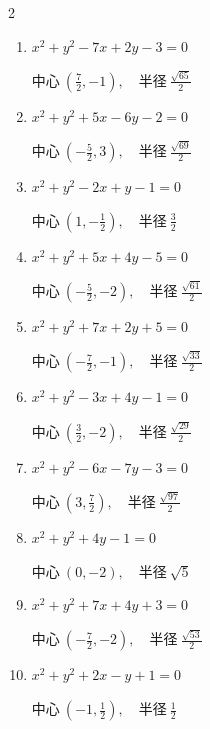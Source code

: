 \begin{multicols}{2}
\begin{enumerate}
        $\displaystyle 中心\: \left(\frac{3}{2},-2\right), \quad 半径 \ \frac{\sqrt{17}}{2}$

  \item $x^{2}+y^{2}-7x+2y-3=0$

        $\displaystyle 中心\: \left(\frac{7}{2},-1\right), \quad 半径 \ \frac{\sqrt{65}}{2}$

  \item $x^{2}+y^{2}+5x-6y-2=0$

        $\displaystyle 中心\: \left(-\frac{5}{2},3\right), \quad 半径 \ \frac{\sqrt{69}}{2}$

  \item $x^{2}+y^{2}-2x+y-1=0$

        $\displaystyle 中心\: \left(1,-\frac{1}{2}\right), \quad 半径 \ \frac{3}{2}$

  \item $x^{2}+y^{2}+5x+4y-5=0$

        $\displaystyle 中心\: \left(-\frac{5}{2},-2\right), \quad 半径 \ \frac{\sqrt{61}}{2}$

\columnbreak %

  \item $x^{2}+y^{2}+7x+2y+5=0$

        $\displaystyle 中心\: \left(-\frac{7}{2},-1\right), \quad 半径 \ \frac{\sqrt{33}}{2}$

  \item $x^{2}+y^{2}-3x+4y-1=0$

        $\displaystyle 中心\: \left(\frac{3}{2},-2\right), \quad 半径 \ \frac{\sqrt{29}}{2}$

  \item $x^{2}+y^{2}-6x-7y-3=0$

        $\displaystyle 中心\: \left(3,\frac{7}{2}\right), \quad 半径 \ \frac{\sqrt{97}}{2}$

  \item $x^{2}+y^{2}+4y-1=0$

        $\displaystyle 中心\: \left(0,-2\right), \quad 半径 \ \sqrt{5}$

  \item $x^{2}+y^{2}+7x+4y+3=0$

        $\displaystyle 中心\: \left(-\frac{7}{2},-2\right), \quad 半径 \ \frac{\sqrt{53}}{2}$

  \item $x^{2}+y^{2}+2x-y+1=0$

        $\displaystyle 中心\: \left(-1,\frac{1}{2}\right), \quad 半径 \ \frac{1}{2}$


\end{enumerate}
\end{multicols}
